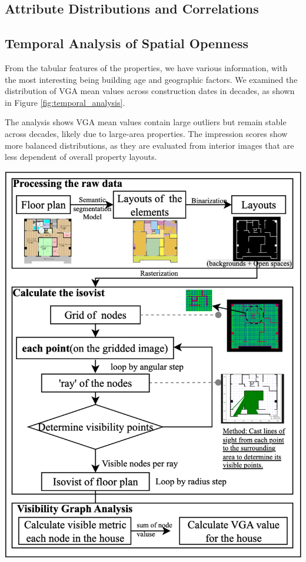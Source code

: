 \documentclass[11pt,a4paper]{article}
\begin{document}
\begin{multicols}{2}
\section{Attribute Distributions and Correlations}

\subsection{Temporal Analysis of Spatial Openness}
From the tabular features of the properties, we have various information, with the most interesting 
being building age and geographic factors. 
We examined the distribution of VGA mean values across construction dates in decades, as shown in 
Figure \ref{fig:temporal_analysis}.

The analysis shows VGA mean values contain large outliers but remain stable across decades, likely due to large-area properties. 
The impression scores show more balanced distributions, as they are evaluated from interior images that are less dependent of overall property layouts.
\begin{center}
    \includegraphics[width=0.95\columnwidth]{plots/vga_process.png}
    \label{fig:madori_processing}
\end{center}


\end{multicols}
\end{document}
